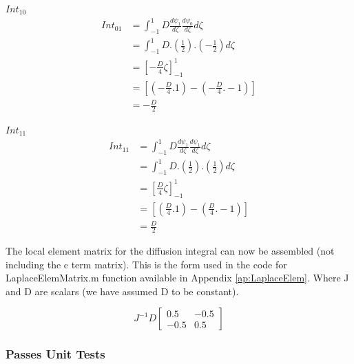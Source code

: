 \documentclass[11pt]{article}
\begin{document}
\underline{$Int_{10}$} \\


\begin{equation}\label{eq:Int10}
\begin{split}
 Int_{01} &= \int_{-1}^{1} D \frac{d\psi_{1}}{d\zeta} \frac{d\psi_{0}}{d \zeta} d \zeta \\
&=  \int_{-1}^{1} D .( \frac{1}{2}). (-\frac{1}{2}) d\zeta \\
& = \left[-\frac{D}{4} \zeta \right]_{-1}^{1} \\
& = \left[ (-\frac{D}{4}.1) - (-\frac{D}{4}.-1) \right] \\
& = -\frac{D}{2}
\end{split}
\end{equation}


\clearpage

\underline{$Int_{11}$} \\


\begin{equation}\label{eq:Int11}
\begin{split}
 Int_{11} &= \int_{-1}^{1} D \frac{d\psi_{1}}{d\zeta} \frac{d\psi_{1}}{d \zeta} d \zeta \\
&=  \int_{-1}^{1} D .( \frac{1}{2}). (\frac{1}{2}) d\zeta \\
& = \left [\frac{D}{4} \zeta \right ]_{-1}^{1} \\
& = \left [ (\frac{D}{4}.1) - (\frac{D}{4}.-1) \right ] \\
& = \frac{D}{2}
\end{split}
\end{equation}

The local element matrix for the diffusion integral can now be assembled (not including the c term matrix). This is the form used in the code for LaplaceElemMatrix.m function available in Appendix \ref{ap:LaplaceElem}. Where J and D are scalars (we have assumed D to be constant).

\begin{equation} \label{eq:diffmatrix}
J^{-1}D
\begin{bmatrix}

0.5 & -0.5 \\
-0.5 & 0.5
\end{bmatrix}
\end{equation}


\subsubsection{Passes Unit Tests}
\end{document}
